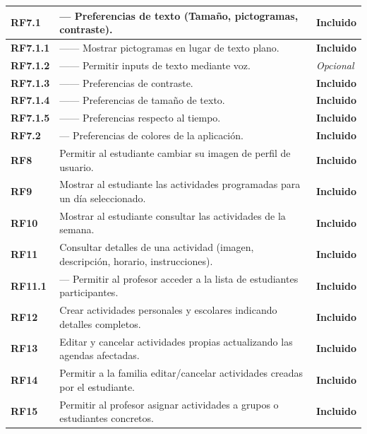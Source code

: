 \begin{xltabular}{\textwidth}{|p{2.2cm}|X|p{2.8cm}|}
\textbf{RF7.1} & --- Preferencias de texto (Tamaño, pictogramas, contraste). & \textbf{Incluido} \\ \hline
\textbf{RF7.1.1} & ------ Mostrar pictogramas en lugar de texto plano. & \textbf{Incluido} \\ \hline
\textbf{RF7.1.2} & ------ Permitir inputs de texto mediante voz. & \textit{Opcional} \\ \hline
\textbf{RF7.1.3} & ------ Preferencias de contraste. & \textbf{Incluido} \\ \hline
\textbf{RF7.1.4} & ------ Preferencias de tamaño de texto. & \textbf{Incluido} \\ \hline
\textbf{RF7.1.5} & ------ Preferencias respecto al tiempo. & \textbf{Incluido} \\ \hline
\textbf{RF7.2} & --- Preferencias de colores de la aplicación. & \textbf{Incluido} \\ \hline
\textbf{RF8} & Permitir al estudiante cambiar su imagen de perfil de usuario. & \textbf{Incluido} \\ \hline
\textbf{RF9} & Mostrar al estudiante las actividades programadas para un día seleccionado. & \textbf{Incluido} \\ \hline
\textbf{RF10} & Mostrar al estudiante consultar las actividades de la semana. & \textbf{Incluido} \\ \hline
\textbf{RF11} & Consultar detalles de una actividad (imagen, descripción, horario, instrucciones). & \textbf{Incluido} \\ \hline
\textbf{RF11.1} & --- Permitir al profesor acceder a la lista de estudiantes participantes. & \textbf{Incluido} \\ \hline
\textbf{RF12} & Crear actividades personales y escolares indicando detalles completos. & \textbf{Incluido} \\ \hline
\textbf{RF13} & Editar y cancelar actividades propias actualizando las agendas afectadas. & \textbf{Incluido} \\ \hline
\textbf{RF14} & Permitir a la familia editar/cancelar actividades creadas por el estudiante. & \textbf{Incluido} \\ \hline
\textbf{RF15} & Permitir al profesor asignar actividades a grupos o estudiantes concretos. & \textbf{Incluido} \\ \hline

\end{xltabular}
